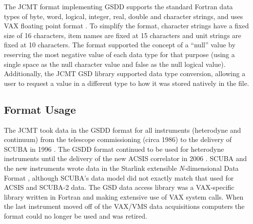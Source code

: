 \documentclass[final,authoryear,5p,times,twocolumn]{elsarticle}
\begin{document}
The JCMT format implementing GSDD supports the standard Fortran data
types of byte, word, logical, integer, real, double and character
strings, and uses VAX floating point format \citep[see][for more
information on VAX floating point format]{Payne:1980:VFP:641845.641849}. To simplify the format,
character strings have a fixed size of 16 characters, item names are
fixed at 15 characters and unit strings are fixed at 10
characters. The format supported the concept of a ``null'' value by
reserving the most negative value of each data type for that purpose
(using a single space as the null character value and false as the
null logical value). Additionally, the JCMT GSD library supported data
type conversion, allowing a user to request a value in a different
type to how it was stored natively in the file.

\subsection{Format Usage}

The JCMT took data in the GSDD format for all instruments (heterodyne
and continuum) from the telescope commissioning (circa 1986) to the
delivery of SCUBA in 1996 \citep{1999MNRAS.303..659H}. The GSDD format
continued to be used for heterodyne instruments until the delivery of
the new ACSIS correlator in 2006 \citep{2009MNRAS.399.1026B}. SCUBA
and the new instruments wrote data in the Starlink extensible
\emph{N}-dimensional Data Format \citep[NDF;][]{2015NDF}, although
SCUBA's data model did not exactly match that used for ACSIS and
SCUBA-2 \citep{2013MNRAS.430.2513H} data. The GSD data access library
was a VAX-specific library \citep{1986QJRAS..27..675.,mtdn84} written
in Fortran and making extensive use of VAX system calls. When
the last instrument moved off of the VAX/VMS data acquisitions computers
the format could no longer be used and was retired.
\end{document}
